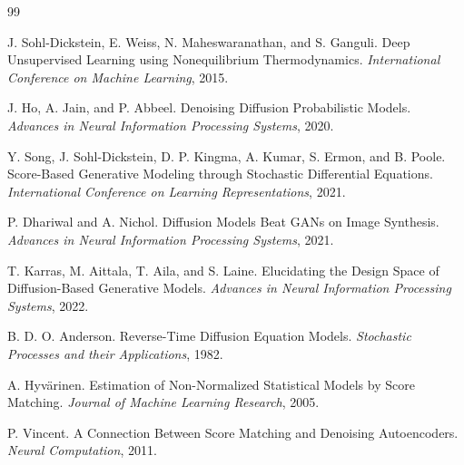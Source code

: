 \documentclass[11pt]{article}
\begin{document}
\begin{thebibliography}{99}

J. Sohl-Dickstein, E. Weiss, N. Maheswaranathan, and S. Ganguli.
\newblock Deep Unsupervised Learning using Nonequilibrium Thermodynamics.
\newblock \emph{International Conference on Machine Learning}, 2015.

J. Ho, A. Jain, and P. Abbeel.
\newblock Denoising Diffusion Probabilistic Models.
\newblock \emph{Advances in Neural Information Processing Systems}, 2020.

Y. Song, J. Sohl-Dickstein, D. P. Kingma, A. Kumar, S. Ermon, and B. Poole.
\newblock Score-Based Generative Modeling through Stochastic Differential Equations.
\newblock \emph{International Conference on Learning Representations}, 2021.

P. Dhariwal and A. Nichol.
\newblock Diffusion Models Beat GANs on Image Synthesis.
\newblock \emph{Advances in Neural Information Processing Systems}, 2021.

T. Karras, M. Aittala, T. Aila, and S. Laine.
\newblock Elucidating the Design Space of Diffusion-Based Generative Models.
\newblock \emph{Advances in Neural Information Processing Systems}, 2022.

B. D. O. Anderson.
\newblock Reverse-Time Diffusion Equation Models.
\newblock \emph{Stochastic Processes and their Applications}, 1982.

A. Hyv\"{a}rinen.
\newblock Estimation of Non-Normalized Statistical Models by Score Matching.
\newblock \emph{Journal of Machine Learning Research}, 2005.

P. Vincent.
\newblock A Connection Between Score Matching and Denoising Autoencoders.
\newblock \emph{Neural Computation}, 2011.

\end{thebibliography}
\end{document}
